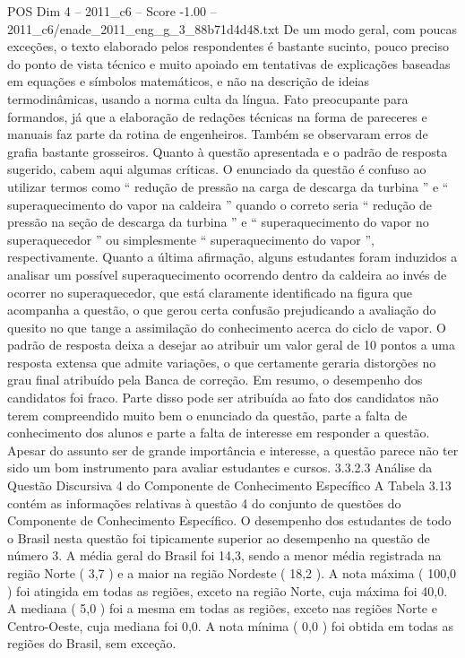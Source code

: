 \begin{textsample}{POS Dim 4 – 2011\_c6 – Score -1.00 – 2011\_c6/enade\_2011\_eng\_g\_3\_88b71d4d48.txt}
De um modo geral, com poucas exceções, o texto elaborado pelos respondentes é bastante sucinto, pouco preciso do ponto de vista técnico e muito apoiado em tentativas de explicações baseadas em equações e símbolos matemáticos, e não na descrição de ideias termodinâmicas, usando a norma culta da língua.
Fato preocupante para formandos, já que a elaboração de redações técnicas na forma de pareceres e manuais faz parte da rotina de engenheiros.
Também se observaram erros de grafia bastante grosseiros.
Quanto à questão apresentada e o padrão de resposta sugerido, cabem aqui algumas críticas.
O enunciado da questão é confuso ao utilizar termos como “ redução de pressão na carga de descarga da turbina ” e “ superaquecimento do vapor na caldeira ” quando o correto seria “ redução de pressão na seção de descarga da turbina ” e “ superaquecimento do vapor no superaquecedor ” ou simplesmente “ superaquecimento do vapor ”, respectivamente.
Quanto a última afirmação, alguns estudantes foram induzidos a analisar um possível superaquecimento ocorrendo dentro da caldeira ao invés de ocorrer no superaquecedor, que está claramente identificado na figura que acompanha a questão, o que gerou certa confusão prejudicando a avaliação do quesito no que tange a assimilação do conhecimento acerca do ciclo de vapor.
O padrão de resposta deixa a desejar ao atribuir um valor geral de 10 pontos a uma resposta extensa que admite variações, o que certamente geraria distorções no grau final atribuído pela Banca de correção.
Em resumo, o desempenho dos candidatos foi fraco.
Parte disso pode ser atribuída ao fato dos candidatos não terem compreendido muito bem o enunciado da questão, parte a falta de conhecimento dos alunos e parte a falta de interesse em responder a questão.
Apesar do assunto ser de grande importância e interesse, a questão parece não ter sido um bom instrumento para avaliar estudantes e cursos. 3.3.2.3 Análise da Questão Discursiva 4 do Componente de Conhecimento Específico A Tabela 3.13 contém as informações relativas à questão 4 do conjunto de questões do Componente de Conhecimento Específico.
O desempenho dos estudantes de todo o Brasil nesta questão foi tipicamente superior ao desempenho na questão de número 3.
A média geral do Brasil foi 14,3, sendo a menor média registrada na região Norte ( 3,7 ) e a maior na região Nordeste ( 18,2 ).
A nota máxima ( 100,0 ) foi atingida em todas as regiões, exceto na região Norte, cuja máxima foi 40,0.
A mediana ( 5,0 ) foi a mesma em todas as regiões, exceto nas regiões Norte e Centro-Oeste, cuja mediana foi 0,0.
A nota mínima ( 0,0 ) foi obtida em todas as regiões do Brasil, sem exceção.

\end{textsample}
